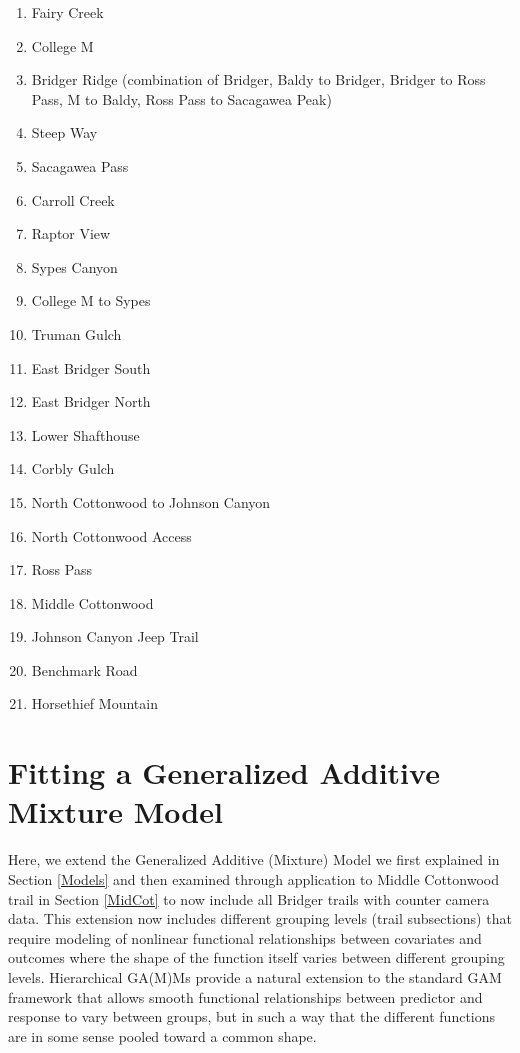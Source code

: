 \documentclass[
]{book}
\providecommand{\tightlist}{%
  \setlength{\itemsep}{0pt}\setlength{\parskip}{0pt}}
\begin{document}
\begin{enumerate}
\def\labelenumi{\arabic{enumi}.}
\tightlist
\item
  Fairy Creek
\item
  College M
\item
  Bridger Ridge (combination of Bridger, Baldy to Bridger, Bridger to Ross Pass, M to Baldy, Ross Pass to Sacagawea Peak)
\item
  Steep Way
\item
  Sacagawea Pass
\item
  Carroll Creek
\item
  Raptor View
\item
  Sypes Canyon
\item
  College M to Sypes
\item
  Truman Gulch
\item
  East Bridger South
\item
  East Bridger North
\item
  Lower Shafthouse
\item
  Corbly Gulch
\item
  North Cottonwood to Johnson Canyon
\item
  North Cottonwood Access
\item
  Ross Pass
\item
  Middle Cottonwood
\item
  Johnson Canyon Jeep Trail
\item
  Benchmark Road
\item
  Horsethief Mountain
\end{enumerate}

\hypertarget{fitting-a-generalized-additive-mixture-model}{%
\section{Fitting a Generalized Additive Mixture Model}\label{fitting-a-generalized-additive-mixture-model}}

Here, we extend the Generalized Additive (Mixture) Model we first explained in Section \ref{Models} and then examined through application to Middle Cottonwood trail in Section \ref{MidCot} to now include all Bridger trails with counter camera data. This extension now includes different grouping levels (trail subsections) that require modeling of nonlinear functional relationships between covariates and outcomes where the shape of the function itself varies between different grouping levels. Hierarchical GA(M)Ms provide a natural extension to the standard GAM framework that allows smooth functional relationships between predictor and response to vary between groups, but in such a way that the different functions are in some sense pooled toward a common shape.
\end{document}
